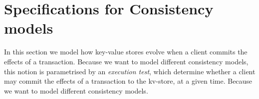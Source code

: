 \section{Specifications for Consistency models}
\label{sec:execution-tests}
\label{sec:execution.tests}
\label{sec:spec}

In this section we model how key-value stores evolve when a client commits 
the effects of a transaction.
Because we want to model different consistency models, 
this notion is parametrised by an \emph{execution test}, which determine whether 
a client may commit the effects of a transaction to the kv-store, at a given time.
Because we want to model different consistency models.

%

